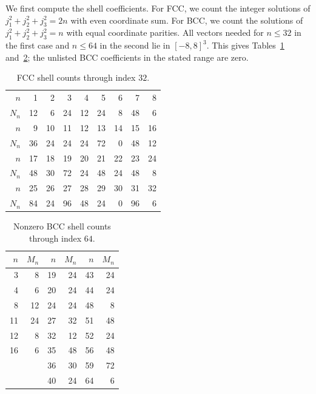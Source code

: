 \documentclass[reqno,english]{amsart}
\theoremstyle{definition}
\newtheorem{open problem}[theorem]{Open Problem}
\theoremstyle{remark}
\theoremstyle{plain}
\numberwithin{equation}{section}
\begin{document}
We first compute the shell coefficients. For FCC, we count the integer
solutions of $j_1^2+j_2^2+j_3^2=2n$ with even coordinate sum. For BCC,
we count the solutions of $j_1^2+j_2^2+j_3^2=n$ with equal coordinate
parities. All vectors needed for $n\le32$ in the first case and
$n\le64$ in the second lie in $[-8,8]^3$. This gives
Tables~\ref{T:tab:fcc-counts} and~\ref{T:tab:bcc-counts}; the
unlisted BCC coefficients in the stated range are zero.

\begin{table}[!htbp]
\centering
\caption{FCC shell counts through index $32$.}\label{T:tab:fcc-counts}
\begin{tabular}{@{}r|rrrrrrrr@{}}
\toprule
$n$ & 1&2&3&4&5&6&7&8\\
$N_n$&12&6&24&12&24&8&48&6\\
\midrule
$n$&9&10&11&12&13&14&15&16\\
$N_n$&36&24&24&24&72&0&48&12\\
\midrule
$n$&17&18&19&20&21&22&23&24\\
$N_n$&48&30&72&24&48&24&48&8\\
\midrule
$n$&25&26&27&28&29&30&31&32\\
$N_n$&84&24&96&48&24&0&96&6\\
\bottomrule
\end{tabular}
\end{table}

\begin{table}[!htbp]
\centering
\caption{Nonzero BCC shell counts through index $64$.}\label{T:tab:bcc-counts}
\begin{tabular}{@{}rr@{\qquad}rr@{\qquad}rr@{}}
\toprule
$n$&$M_n$&$n$&$M_n$&$n$&$M_n$\\
\midrule
3&8&19&24&43&24\\
4&6&20&24&44&24\\
8&12&24&24&48&8\\
11&24&27&32&51&48\\
12&8&32&12&52&24\\
16&6&35&48&56&48\\
&&36&30&59&72\\
&&40&24&64&6\\
\bottomrule
\end{tabular}
\end{table}
\end{document}

